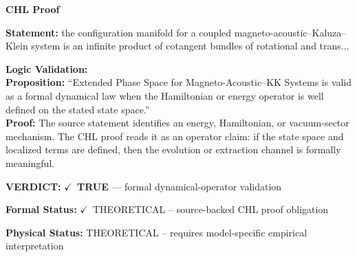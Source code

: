 \vspace{0.45em}
\noindent\textbf{CHL Proof}\par
\textbf{Statement:} the configuration manifold for a coupled magneto-acoustic--Kaluza--Klein system is an
infinite product of cotangent bundles of rotational and trans...

\textbf{Logic Validation:}\\
\textbf{Proposition:} ``Extended Phase Space for Magneto-Acoustic--KK Systems is valid as a formal dynamical law
when the Hamiltonian or energy operator is well defined on the stated state space.''\\
\textbf{Proof:} The source statement identifies an energy, Hamiltonian, or vacuum-sector mechanism. The
CHL proof reads it as an operator claim: if the state space and localized terms are
defined, then the evolution or extraction channel is formally meaningful.

\textbf{VERDICT:} \ensuremath{\checkmark}\ \textbf{TRUE} --- formal dynamical-operator validation

\textbf{Formal Status:} \ensuremath{\checkmark}\ THEORETICAL -- source-backed CHL proof obligation

\textbf{Physical Status:} THEORETICAL -- requires model-specific empirical interpretation
\par\vspace{0.45em}
\par
\ifTZPDarkEdition
{}
\fi
\endgroup
\endgroup
